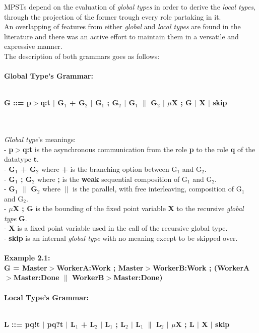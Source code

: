 \normalsize
MPSTs depend on the evaluation of \textit{global types} in order to derive the \textit{local types}, through the projection of the former trough every role partaking in it.\\
An overlapping of features from either \textit{global} and \textit{local types} are found in the literature \cite{jongmans2022st4mp} and there was an active effort to maintain them in a versatile and expressive manner.\\
The description of both grammars goes as follows:\\
\\
\textbf{Global Type's Grammar:}\\
\\
\centerline{\textbf{G ::= p$>$q:t $\vert$ G$_1$ + G$_2$ $\vert$ G$_1$ ; G$_2$ $\vert$ G$_1$ $\|$ G$_2$ $\vert$ $\mu$X ; G $\vert$ X $\vert$ skip}}\\
\\
\textit{Global type}'s meanings:\\
- \textbf{p$>$q:t} is the asynchronous communication from the role \textbf{p} to the role \textbf{q} of the datatype \textbf{t}.\\
- \textbf{G$_1$ + G$_2$} where \textbf{+} is the branching option between G$_1$ and G$_2$.\\
- \textbf{G$_1$ ; G$_2$} where \textbf{;} is the \textbf{weak} sequential composition of G$_1$ and G$_2$.\\
- \textbf{G$_1$ $\|$ G$_2$} where \textbf{$\|$} is the parallel, with free interleaving, composition of G$_1$ and G$_2$.\\
- \textbf{$\mu$X ; G} is the bounding of the fixed point variable \textbf{X} to the recursive \textit{global type} \textbf{G}.\\
- \textbf{X} is a fixed point variable used in the call of the recursive global type.\\
- \textbf{skip} is an internal \textit{global type} with no meaning except to be skipped over.\\
\\
\textbf{Example 2.1:}\\
\scriptsize
\textbf{G = Master$>$WorkerA:Work ; Master$>$WorkerB:Work ; (WorkerA$>$Master:Done $\|$ WorkerB$>$Master:Done)}\\
\\
\normalsize
\textbf{Local Type's Grammar:}\\
\\
\centerline{\textbf{L ::= pq!t $\vert$ pq?t $\vert$ L$_1$ + L$_2$ $\vert$ L$_1$ ; L$_2$ $\vert$ L$_1$ $\|$ L$_2$ $\vert$ $\mu$X ; L $\vert$ X $\vert$ skip}}\\
